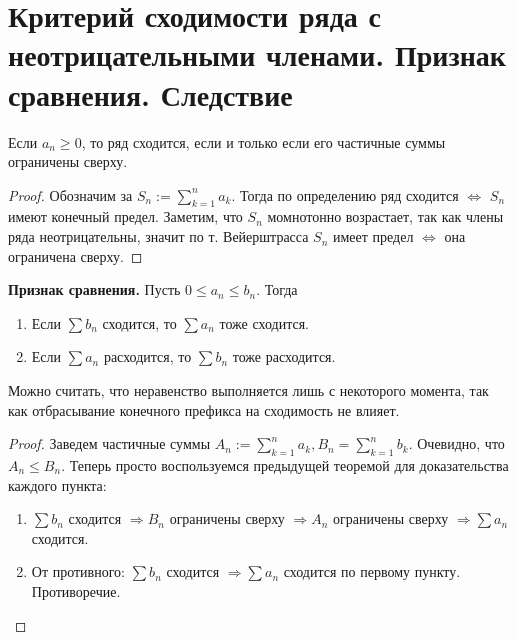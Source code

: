 \section{Критерий сходимости ряда с неотрицательными членами. Признак сравнения. Следствие}
\begin{theorem}
    Если $a_n \geqslant 0$, то ряд сходится, если и только если его частичные суммы ограничены сверху.
\end{theorem}
\begin{proof}
    Обозначим за $S_n := \sum\limits_{k=1}^n a_k$. 
    Тогда по определению ряд сходится $\Leftrightarrow$ $S_n$ имеют конечный предел.
    Заметим, что $S_n$ момнотонно возрастает, так как члены ряда неотрицательны, значит по т. Вейерштрасса $S_n$ имеет предел $\Leftrightarrow$ она ограничена сверху.
\end{proof}

\vspace{4mm}

\textbf{Признак сравнения.} 
Пусть $0 \leqslant a_n \leqslant b_n$. 
Тогда \begin{enumerate}
    \item Если $\sum b_n$ сходится, то $\sum a_n$ тоже сходится.
    \item Если $\sum a_n$ расходится, то $\sum b_n$ тоже расходится.
\end{enumerate}
Можно считать, что неравенство выполняется лишь с некоторого момента, так как отбрасывание конечного префикса на сходимость не влияет.
\begin{proof}
    Заведем частичные суммы $A_n := \sum\limits_{k=1}^n a_k, B_n = \sum\limits_{k=1}^n b_k$.
    Очевидно, что $A_n \leqslant B_n$.
    Теперь просто воспользуемся предыдущей теоремой для доказательства каждого пункта:
    \begin{enumerate}
        \item $\sum b_n$ сходится $\Rightarrow B_n$ ограничены сверху $\Rightarrow A_n$ ограничены сверху $\Rightarrow \sum a_n$ сходится. 
        \item От противного: $\sum b_n$ сходится $\Rightarrow \sum a_n$ сходится по первому пункту. Противоречие. 
    \end{enumerate}
\end{proof}

